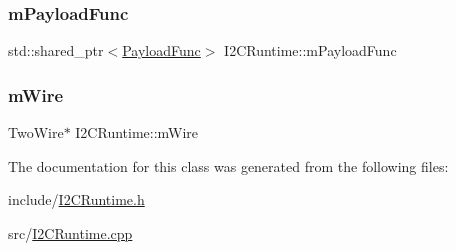 \mbox{\label{class_i2_c_runtime_a2e84a62078fc0169f8abd9e126ed5f38}} 
\subsubsection{\texorpdfstring{m\+Payload\+Func}{mPayloadFunc}}
{\footnotesize\ttfamily std\+::shared\+\_\+ptr$<$\mbox{\hyperlink{_telemetry_protocol_8h_a98c05796bd59110e8ae10dc71580b759}{Payload\+Func}}$>$ I2\+C\+Runtime\+::m\+Payload\+Func}

\mbox{\label{class_i2_c_runtime_a89c15b30195945ec61834ee3f7f8ac88}} 
\subsubsection{\texorpdfstring{m\+Wire}{mWire}}
{\footnotesize\ttfamily Two\+Wire$\ast$ I2\+C\+Runtime\+::m\+Wire\hspace{0.3cm}{\ttfamily [private]}}



The documentation for this class was generated from the following files\+:\begin{DoxyCompactItemize}
\item 
include/\mbox{\hyperlink{_i2_c_runtime_8h}{I2\+C\+Runtime.\+h}}\item 
src/\mbox{\hyperlink{_i2_c_runtime_8cpp}{I2\+C\+Runtime.\+cpp}}\end{DoxyCompactItemize}
